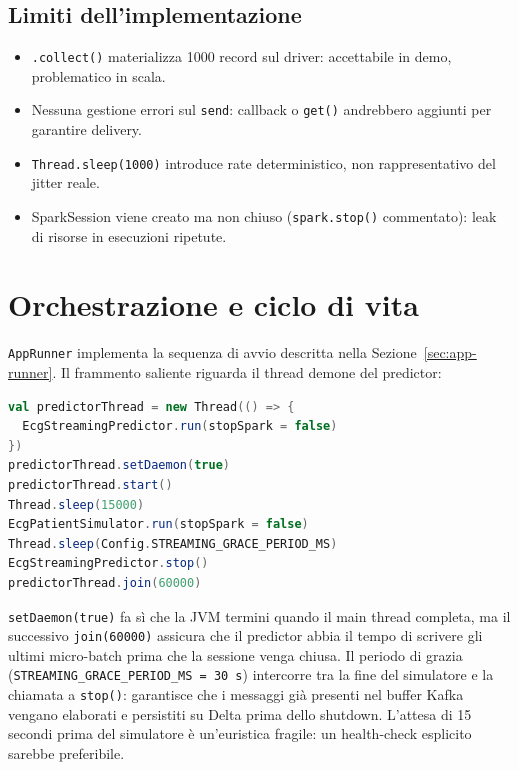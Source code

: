 \subsection{Limiti dell'implementazione}

\begin{itemize}
  \item \texttt{.collect()} materializza 1000 record sul driver: accettabile in demo, problematico in scala.
  \item Nessuna gestione errori sul \texttt{send}: callback o \texttt{get()} andrebbero aggiunti per garantire delivery.
  \item \texttt{Thread.sleep(1000)} introduce rate deterministico, non rappresentativo del jitter reale.
  \item SparkSession viene creato ma non chiuso (\texttt{spark.stop()} commentato): leak di risorse in esecuzioni ripetute.
\end{itemize}

\section{Orchestrazione e ciclo di vita}\label{sec:orchestrazione}

\texttt{AppRunner} implementa la sequenza di avvio descritta nella Sezione~\ref{sec:app-runner}.
Il frammento saliente riguarda il thread demone del predictor:

\begin{lstlisting}[language=Scala,caption={Avvio predictor in thread demone con shutdown controllato.},label={lst:app-runner-thread}]
val predictorThread = new Thread(() => {
  EcgStreamingPredictor.run(stopSpark = false)
})
predictorThread.setDaemon(true)
predictorThread.start()
Thread.sleep(15000)
EcgPatientSimulator.run(stopSpark = false)
Thread.sleep(Config.STREAMING_GRACE_PERIOD_MS)
EcgStreamingPredictor.stop()
predictorThread.join(60000)
\end{lstlisting}

\texttt{setDaemon(true)} fa sì che la JVM termini quando il main thread completa, ma il successivo \texttt{join(60000)} assicura che il predictor abbia il tempo di scrivere gli ultimi micro-batch prima che la sessione venga chiusa.
Il periodo di grazia (\texttt{STREAMING\_GRACE\_PERIOD\_MS = 30~s}) intercorre tra la fine del simulatore e la chiamata a \texttt{stop()}: garantisce che i messaggi già presenti nel buffer Kafka vengano elaborati e persistiti su Delta prima dello shutdown.
L'attesa di 15 secondi prima del simulatore è un'euristica fragile: un health-check esplicito sarebbe preferibile.

